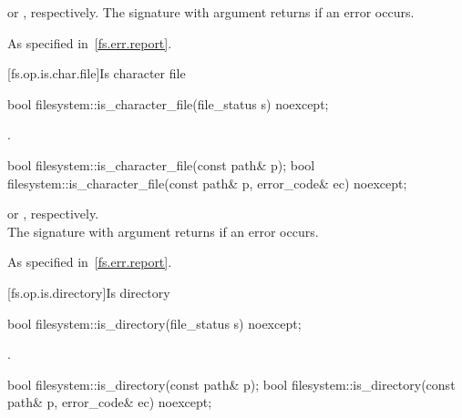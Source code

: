 \begin{itemdescr}
\pnum
\returns
{} or , respectively.
The signature with argument  returns  if an error occurs.

\pnum
\throws
As specified in~\ref{fs.err.report}.
\end{itemdescr}


[fs.op.is.char.file]{Is character file}

%
\begin{itemdecl}
bool filesystem::is_character_file(file_status s) noexcept;
\end{itemdecl}

\begin{itemdescr}
\pnum
\returns
{}.
\end{itemdescr}

%
\begin{itemdecl}
bool filesystem::is_character_file(const path& p);
bool filesystem::is_character_file(const path& p, error_code& ec) noexcept;
\end{itemdecl}

\begin{itemdescr}
\pnum
\returns
{}
  or ,
  respectively.\\The signature with argument  returns 
  if an error occurs.

\pnum
\throws
As specified in~\ref{fs.err.report}.
\end{itemdescr}


[fs.op.is.directory]{Is directory}

%
\begin{itemdecl}
bool filesystem::is_directory(file_status s) noexcept;
\end{itemdecl}

\begin{itemdescr}
\pnum
\returns
{}.
\end{itemdescr}

%
\begin{itemdecl}
bool filesystem::is_directory(const path& p);
bool filesystem::is_directory(const path& p, error_code& ec) noexcept;
\end{itemdecl}


